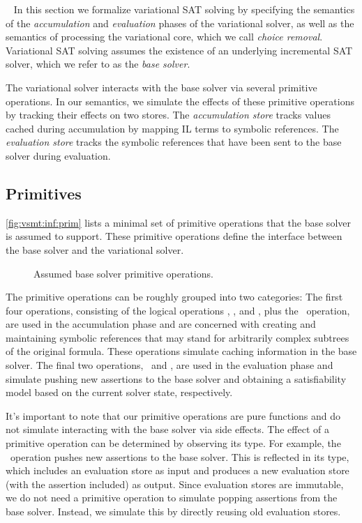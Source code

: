 ~\label{section:vsat:formalization}
%
In this section we formalize variational SAT solving by specifying the
semantics of the \emph{accumulation} and \emph{evaluation} phases of the
variational solver, as well as the semantics of processing the variational
core, which we call \emph{choice removal}.
%
Variational SAT solving assumes the existence of an underlying incremental SAT
solver, which we refer to as the \emph{base solver}.


The variational solver interacts with the base solver via several primitive
operations. In our semantics, we simulate the effects of these primitive
operations by tracking their effects on two stores.
%
The \emph{accumulation store} \aStore{} tracks values cached during
accumulation by mapping IL terms to symbolic references. The \emph{evaluation
store} \eStore{} tracks the symbolic references that have been sent to the base
solver during evaluation.

\subsection{Primitives}
%
\autoref{fig:vsmt:inf:prim} lists a minimal set of primitive operations that
the base solver is assumed to support. These primitive operations define the
interface between the base solver and the variational solver.


\begin{figure}
  
  \caption{Assumed base solver primitive operations.}%
  \label{fig:vsmt:inf:prim}
\end{figure}


The primitive operations can be roughly grouped into two categories:
%
The first four operations, consisting of the logical operations \pnot, \pand,
and \por, plus the \pspawn\ operation, are used in the accumulation phase and
are concerned with creating and maintaining symbolic references that may stand
for arbitrarily complex subtrees of the original formula. These operations
simulate caching information in the base solver.
%
The final two operations, \passert\ and \pmodel, are used in the evaluation
phase and simulate pushing new assertions to the base solver and obtaining a
satisfiability model based on the current solver state, respectively.


It's important to note that our primitive operations are pure functions and do
not simulate interacting with the base solver via side effects. The effect of a
primitive operation can be determined by observing its type. For example, the
\passert\ operation pushes new assertions to the base solver. This is reflected
in its type, which includes an evaluation store as input and produces a new
evaluation store (with the assertion included) as output.
%
Since evaluation stores are immutable, we do not need a primitive operation to
simulate popping assertions from the base solver. Instead, we simulate this by
directly reusing old evaluation stores.


